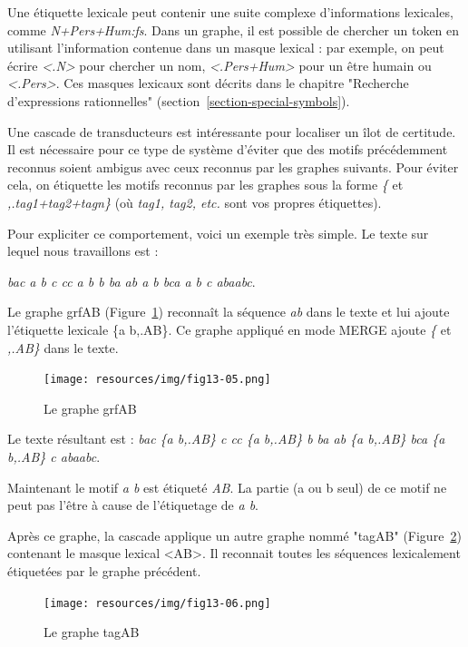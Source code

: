 \bigskip
\noindent Une étiquette lexicale peut contenir une suite complexe d'informations lexicales, comme
\emph{N+Pers+Hum:fs}.
Dans un graphe, il est possible de chercher un token en utilisant l'information contenue dans un
masque lexical : par exemple, on peut écrire \emph{<.N>} pour chercher 
un nom, \emph{<.Pers+Hum>} pour un être humain ou \emph{<.Pers>}. Ces masques lexicaux sont décrits
dans le chapitre "Recherche d'expressions rationnelles" (section~\ref{section-special-symbols}).
 
\bigskip
\noindent Une cascade de
transducteurs est intéressante pour localiser un îlot de certitude. Il est nécessaire pour ce type
de système d'éviter que des motifs précédemment reconnus soient ambigus avec ceux reconnus par les
graphes suivants. Pour éviter cela, on étiquette les motifs reconnus par les graphes sous la forme
\emph{\{} et \emph{,.tag1+tag2+tagn\}} (où \emph{tag1, tag2, etc.} sont vos propres étiquettes).

\bigskip
\noindent Pour expliciter ce comportement, voici un exemple très simple. Le texte sur lequel nous
travaillons est :

\emph{bac a b c cc a b b ba ab a b bca a b c abaabc}.

\bigskip
\noindent Le graphe grfAB (Figure~\ref{fig13-05}) reconnaît la séquence \emph{ab} dans le texte et lui
ajoute l'étiquette lexicale \{a b,.AB\}. Ce graphe appliqué en mode MERGE ajoute \emph{\{ } et
 \emph{,.AB\}} dans le texte.

\begin{figure}[!htb]
  \centering
  \texttt{[image: resources/img/fig13-05.png]}
  \caption{Le graphe grfAB}
  \label{fig13-05}
\end{figure}

\bigskip
\noindent Le texte résultant est : \emph{bac \{a b,.AB\} c cc \{a b,.AB\} b ba ab \{a b,.AB\} bca
\{a b,.AB\} c abaabc}.

\bigskip
\noindent Maintenant le motif \emph{a b} est étiqueté \emph{AB}. La partie (a ou b seul) de ce
motif ne peut pas l'être à cause de l'étiquetage de \emph{a b}.

\bigskip
\noindent Après ce graphe, la cascade applique un autre graphe nommé "tagAB" (Figure~\ref{fig13-06})
contenant le masque lexical <AB>. Il reconnait toutes les séquences lexicalement étiquetées par le
graphe précédent.

\begin{figure}[!htb]
  \centering
  \texttt{[image: resources/img/fig13-06.png]}
  \caption{Le graphe tagAB}
  \label{fig13-06}
\end{figure}

